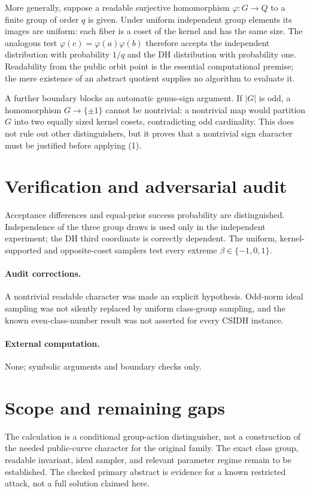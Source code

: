 \documentclass[11pt]{article}
\begin{document}
More generally, suppose a readable surjective homomorphism $\varphi:G\to Q$ to a finite group of order $q$ is given. Under uniform independent group elements its images are uniform: each fiber is a coset of the kernel and has the same size. The analogous test $\varphi(c)=\varphi(a)\varphi(b)$ therefore accepts the independent distribution with probability $1/q$ and the DH distribution with probability one. Readability from the public orbit point is the essential computational premise; the mere existence of an abstract quotient supplies no algorithm to evaluate it.

A further boundary blocks an automatic genus-sign argument. If $|G|$ is odd, a homomorphism $G\to\{\pm1\}$ cannot be nontrivial: a nontrivial map would partition $G$ into two equally sized kernel cosets, contradicting odd cardinality. This does not rule out other distinguishers, but it proves that a nontrivial sign character must be justified before applying (1).
\section{Verification and adversarial audit}
Acceptance differences and equal-prior success probability are distinguished. Independence of the three group draws is used only in the independent experiment; the DH third coordinate is correctly dependent. The uniform, kernel-supported and opposite-coset samplers test every extreme $\beta\in\{-1,0,1\}$.
\paragraph{Audit corrections.} A nontrivial readable character was made an explicit hypothesis. Odd-norm ideal sampling was not silently replaced by uniform class-group sampling, and the known even-class-number result was not asserted for every CSIDH instance.
\paragraph{External computation.} None; symbolic arguments and boundary checks only.
\section{Scope and remaining gaps}
The calculation is a conditional group-action distinguisher, not a construction of the needed public-curve character for the original family. The exact class group, readable invariant, ideal sampler, and relevant parameter regime remain to be established. The checked primary abstract is evidence for a known restricted attack, not a full solution claimed here.
\end{document}
